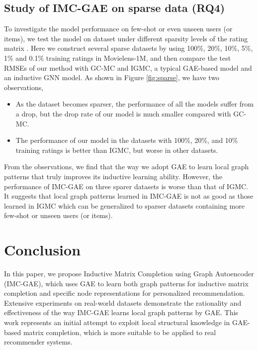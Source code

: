 \documentclass[sigconf]{acmart}
\begin{document}
\subsection{Study of IMC-GAE on sparse data (RQ4)}
To investigate the model performance on few-shot or even unseen users (or items), we test the model on dataset under different sparsity levels of the rating matrix \cite{berg2017graph, zhang2019inductive}. Here we construct several sparse datasets by using 100\%, 20\%, 10\%, 5\%, 1\% and 0.1\% training ratings in Movielens-1M, and then compare the test RMSEs of our method with GC-MC and IGMC, a typical GAE-based model and an inductive GNN model. As shown in Figure \ref{fig:sparse}, we have two observations, 
\begin{itemize}[leftmargin=*]
\item As the dataset becomes sparser, the performance of all the models suffer from a drop, but the drop rate of our model is much smaller compared with GC-MC. 
\item The performance of our model in the datasets with 100\%, 20\%, and 10\% training ratings is better than IGMC, but worse in other datasets.
\end{itemize}

From the observations, we find that the way we adopt GAE to learn local graph patterns that truly improves its inductive learning ability. However, the performance of IMC-GAE on three sparer datasets is worse than that of IGMC. It suggests that local graph patterns learned in IMC-GAE is not as good as those learned in IGMC which can be generalized to sparser datasets containing more few-shot or unseen users (or items). 

\section{Conclusion}
In this paper, we propose Inductive Matrix Completion using Graph Autoencoder (IMC-GAE), which uses GAE to learn both graph patterns for inductive matrix completion and specific node representations for personalized recommendation. Extensive experiments on real-world datasets demonstrate the rationality and effectiveness of the way IMC-GAE learns local graph patterns by GAE. This work represents an initial attempt to exploit local structural knowledge in GAE-based matrix completion, which is more suitable to be applied to real recommender systems.
\clearpage
\balance


\end{document}

